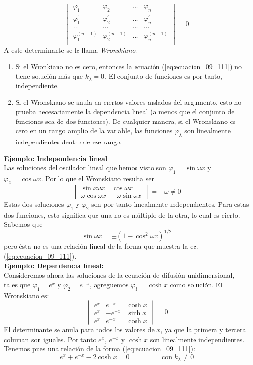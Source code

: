 \begin{equation}
\begin{vmatrix}
\varphi_{1} & \varphi_{2} & \ldots & \varphi_{n} \\
\varphi^{\prime}_{1} & \varphi^{\prime}_{2} & \ldots & \varphi^{\prime}_{n} \\
\ldots & \ldots & \ldots & \ldots \\
\varphi^{(n-1)}_{1} & \varphi^{(n-1)}_{2} & \ldots & \varphi^{(n-1)}_{n} \\
\end{vmatrix} = 0
\label{eq:ecuacion_09_116}
\end{equation}
A este determinante se le llama \emph{Wronskiano}.
\begin{enumerate}
\item Si el Wronkiano no es cero, entonces la ecuación (\ref{eq:ecuacion_09_111}) no tiene solución más que $k_{\lambda}=0$. El conjunto de funciones es por tanto, independiente.
\item Si el Wronskiano se anula en ciertos valores aislados del argumento, esto no prueba necesariamente la dependencia lineal (a menos que el conjunto de funciones sea de dos funciones). De cualquier manera, si el Wronskiano es cero en un rango amplio de la variable, las funciones $\varphi_{\lambda}$ son linealmente independientes dentro de ese rango.
\end{enumerate}
\textbf{Ejemplo: Independencia lineal} 
\\
Las soluciones del oscilador lineal que hemos visto son $\varphi_{1} = \sin \omega x$ y $\varphi_{2} = \cos \omega x$. Por lo que el Wronskiano resulta ser
\[ \begin{vmatrix}
\sin x \omega x & \cos \omega x \\
\omega \cos \omega x & - \omega \sin \omega x
\end{vmatrix} = -\omega \neq 0 \]
Estas dos soluciones $\varphi_{1}$ y $\varphi_{2}$ son por tanto linealmente independientes. Para estas dos funciones, esto significa que una no es múltiplo de la otra, lo cual es cierto.
\\
Sabemos que
\[ \sin \omega x = \pm (1 - \cos^{2} \omega x)^{1/2} \]
pero ésta no es una relación lineal de la forma que muestra la ec. (\ref{eq:ecuacion_09_111}).
\\
\textbf{Ejemplo: Dependencia lineal:}
\\
Consideremos ahora las soluciones de la ecuación de difusión unidimensional, tales que $\varphi_{1} = e^{x}$ y $\varphi_{2} = e^{-x}$, agreguemos $\varphi_{3} = \cosh x$ como solución. El Wronskiano es:
\[ \begin{vmatrix}
e^{x}  & e^{-x} & \cosh x \\
e^{x}  & -e^{-x} & \sinh x \\
e^{x}  & e^{-x} & \cosh x
\end{vmatrix} = 0 \]
El determinante se anula para todos los valores de $x$, ya que la primera y tercera columan son iguales. Por tanto $e^{x}$, $e^{-x}$ y $\cosh	x$ son linealmente independientes. Tenemos pues una relación de la forma (\ref{eq:ecuacion_09_111}):
\[ e^{x} + e^{-x} - 2 \cosh x = 0 \hspace{2cm} \text{con } k_{\lambda} \neq	0 \]
